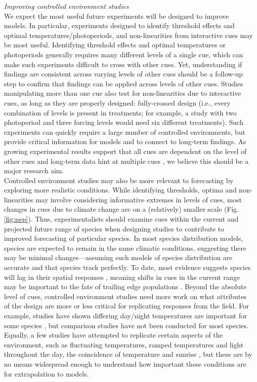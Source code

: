 \documentclass[11pt,letter]{article}
\begin{document}
\emph{Improving controlled environment studies}\\
We expect the most useful future experiments will be designed to improve models. In particular, experiments designed to identify threshold effects and optimal temperatures/photoperiods, and non-linearities from interactive cues may be most useful. Identifying threshold effects and optimal temperatures or photoperiods generally requires many different levels of a single cue, which can make such experiments difficult to cross with other cues. Yet, understanding if findings are consistent across varying levels of other cues should be a follow-up step to confirm that findings can be applied across levels of other cues. Studies manipulating more than one cue also test for non-linearities due to interactive cues, as long as they are properly designed: fully-crossed design (i.e., every combination of levels is present in treatments; for example, a study with two photoperiod and three forcing levels would need six different treatments). Such experiments can quickly require a large number of controlled environments, but provide critical information for models and to connect to long-term findings. As growing experimental results support that all cues are dependent on the level of other cues \citep{stearns1958,flynn2018} and long-term data hint at multiple cues \citep{fu2015}, we believe this should be a major research aim.\\

Controlled environment studies may also be more relevant to forecasting by exploring more realistic conditions. While identifying thresholds, optima and non-linearities may involve considering informative extremes in levels of cues, most changes in cues due to climate change are on a (relatively) smaller scale (Fig. \ref{fig:pep}). Thus, experimentalists should examine cues within the current and projected future range of species when designing studies to contribute to improved forecasting of particular species. In most species distribution models, species are expected to remain in the same climatic conditions, suggesting there may be minimal changes---assuming such models of species distribution are accurate and that species track perfectly. To date, most evidence suggests species will lag in their spatial responses \citep{Loarie:2009ax}, meaning shifts in cues in the current range may be important to the fate of trailing edge populations \citep{bertrand2011changes,lenoir2015climate,savage2015elevational}. Beyond the absolute level of cues, controlled environment studies need more work on what attributes of the design are more or less critical for replicating responses from the field. For example, studies have shown differing day/night temperatures are important for some species \citep{heuvelink1989influence,abrol1996effects,Thingnaes2003,pressman2006exposing}, but comparison studies have not been conducted for most species. Equally, a few studies have attempted to replicate certain aspects of the environment, such as fluctuating temperatures, ramped temperatures and light throughout the day, the coincidence of temperature and sunrise \citep{erwin1998}, but these are by no means widespread enough to understand how important these conditions are for extrapolation to models. \\
\end{document}
